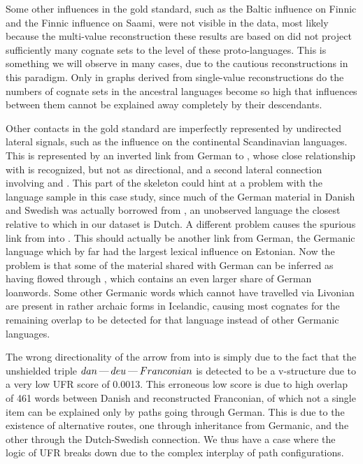 \newpage 
 Some other influences in the gold standard, such as the Baltic influence on Finnic and the Finnic influence on Saami, were not visible in the data, most likely because the multi-value reconstruction these results are based on did not project sufficiently many cognate sets to the level of these proto-languages. This is something we will observe in many cases, due to the cautious reconstructions in this paradigm. Only in graphs derived from single-value reconstructions do the numbers of cognate sets in the ancestral languages become so high that influences between them cannot be explained away completely by their descendants.
 
 Other contacts in the gold standard are imperfectly represented by undirected lateral signals, such as the  influence on the continental Scandinavian languages. This is represented by an inverted link from German to , whose close relationship with  is recognized, but not as directional, and a second lateral connection involving  and . This part of the skeleton could hint at a problem with the language sample in this case study, since much of the German material in Danish and Swedish was actually borrowed from , an unobserved language the closest relative to which in our dataset is Dutch. A different problem causes the spurious link from  into . This should actually be another link from German, the Germanic language which by far had the largest lexical influence on Estonian. Now the problem is that some of the material shared with German can be inferred as having flowed through , which contains an even larger share of German loanwords. Some other Germanic words which cannot have travelled via Livonian are present in rather archaic forms in Icelandic, causing most cognates for the remaining overlap to be detected for that language instead of other Germanic languages.
 
 The wrong directionality of the arrow from  into  is simply due to the fact that the unshielded triple $dan \kern 2pt\hbox{---}\kern 2pt deu \kern 2pt\hbox{---}\kern 2pt Franconian$ is detected to be a v-structure due to a very low UFR score of 0.0013. This erroneous low score is due to high overlap of 461 words between Danish and reconstructed Franconian, of which not a single item can be explained only by paths going through German. This is due to the existence of alternative routes, one through inheritance from Germanic, and the other through the Dutch-Swedish connection. We thus have a case where the logic of UFR breaks down due to the complex interplay of path configurations.
 
